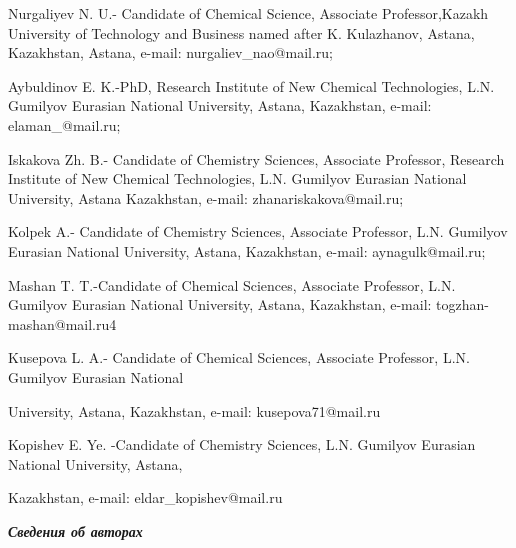 \begin{noparindent}
Nurgaliyev N. U.- Candidate of Chemical Science, Associate
Professor,Kazakh University of Technology and Business named after K.
Kulazhanov, Astana, Kazakhstan, Astana, e-mail: nurgaliev\_nao@mail.ru;

Aybuldinov E. K.-PhD, Research Institute of New Chemical Technologies,
L.N. Gumilyov Eurasian National University, Astana, Kazakhstan, e-mail:
elaman\_@mail.ru;

Iskakova Zh. B.- Candidate of Chemistry Sciences, Associate Professor,
Research Institute of New Chemical Technologies, L.N. Gumilyov Eurasian
National University, Astana Kazakhstan, e-mail: zhanariskakova@mail.ru;

Kolpek A.- Candidate of Chemistry Sciences, Associate Professor, L.N.
Gumilyov Eurasian National University, Astana, Kazakhstan, e-mail:
aynagulk@mail.ru;

Mashan T. T.-Candidate of Chemical Sciences, Associate Professor, L.N.
Gumilyov Eurasian National University, Astana, Kazakhstan, e-mail:
togzhan-mashan@mail.ru4

Kusepova L. A.- Candidate of Chemical Sciences, Associate Professor,
L.N. Gumilyov Eurasian National

University, Astana, Kazakhstan, e-mail:
kusepova71@mail.ru

Kopishev E. Ye. -Candidate of Chemistry Sciences, L.N. Gumilyov Eurasian
National University, Astana,

Kazakhstan, e-mail: eldar\_kopishev@mail.ru
\end{noparindent}

\emph{{\bfseries Сведения об авторах}}

